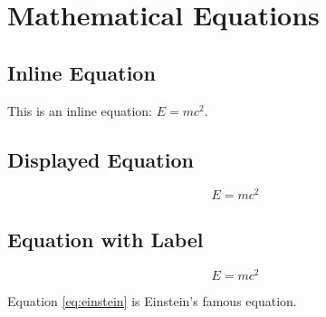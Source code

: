 \documentclass{article}
\begin{document}
\section*{Mathematical Equations}

\subsection*{Inline Equation}
This is an inline equation: $E = mc^2$.

\subsection*{Displayed Equation}
\[
    E = mc^2
\]

\subsection*{Equation with Label}
\begin{equation}
    E = mc^2
    \label{eq:einstein}
\end{equation}

Equation \ref{eq:einstein} is Einstein's famous equation.
\end{document}
